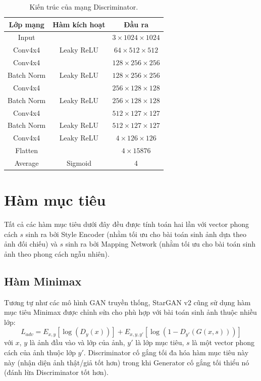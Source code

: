 \documentclass[12pt]{extreport}
\begin{document}
\begin{table}[H]
    \centering
    \begin{tabular}{c c c}
        Lớp mạng   & Hàm kích hoạt & Đầu ra                        \\
        \hline
        Input      &               & $ 3 \times 1024 \times 1024 $ \\
        \hline
        Conv4x4    & Leaky ReLU    & $ 64 \times 512 \times 512 $  \\
        Conv4x4    &               & $ 128 \times 256 \times 256 $ \\
        Batch Norm & Leaky ReLU    & $ 128 \times 256 \times 256 $ \\
        Conv4x4    &               & $ 256 \times 128 \times 128 $ \\
        Batch Norm & Leaky ReLU    & $ 256 \times 128 \times 128 $ \\
        Conv4x4    &               & $ 512 \times 127 \times 127 $ \\
        Batch Norm & Leaky ReLU    & $ 512 \times 127 \times 127 $ \\
        Conv4x4    & Leaky ReLU    & $ 4 \times 126 \times 126 $   \\
        Flatten    &               & $ 4 \times 15876 $            \\
        Average    & Sigmoid       & 4
    \end{tabular}
    \caption{Kiến trúc của mạng Discriminator.}
\end{table}

\section{Hàm mục tiêu}

Tất cả các hàm mục tiêu dưới đây đều được tính toán hai lần với vector phong cách $ s $ sinh ra bởi Style Encoder (nhằm tối ưu cho bài toán sinh ảnh dựa theo ảnh đối chiếu) và $ s $ sinh ra bởi Mapping Network (nhằm tối ưu cho bài toán sinh ảnh theo phong cách ngẫu nhiên).

\subsection{Hàm Minimax}

Tương tự như các mô hình GAN truyền thống, StarGAN v2 cũng sử dụng hàm mục tiêu Minimax được chỉnh sửa cho phù hợp với bài toán sinh ảnh thuộc nhiều lớp:
$$ L_{adv} =  E_{x,y} [\log(D_y(x))] + E_{x,y,y'} [\log(1 - D_{y'}(G(x,s)))] $$
với $ x $, $ y $ là ảnh đầu vào và lớp của ảnh, $ y' $ là lớp mục tiêu, $ s $ là một vector phong cách của ảnh thuộc lớp $ y' $. Discriminator cố gắng tối đa hóa hàm mục tiêu này này (nhận diện ảnh thật/giả tốt hơn) trong khi Generator cố gắng tối thiểu nó (đánh lừa Discriminator tốt hơn).
\end{document}
